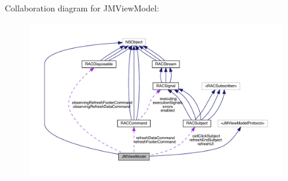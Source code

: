 Collaboration diagram for J\+M\+View\+Model\+:\nopagebreak
\begin{figure}[H]
\begin{center}
\leavevmode
\includegraphics[width=350pt]{interface_j_m_view_model__coll__graph}
\end{center}
\end{figure}
